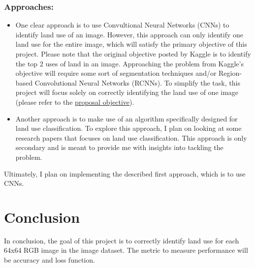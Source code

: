 \documentclass[acmtog]{acmart}
\begin{document}
	\subsubsection{Approaches:}
	\begin{itemize}
		\item One clear approach is to use Convultional Neural Networks (CNNs) to identify land use of an image. However, this approach can only identify one land use for the entire image, which will satisfy the primary objective of this project. Please note that the original objective posted by Kaggle is to identify the top 2 uses of land in an image. Approaching the problem from Kaggle's objective will require some sort of segmentation techniques and/or Region-based Convolutional Neural Networks (RCNNs). To simplify the task, this project will focus solely on correctly identifying the land use of one image (please refer to the \hyperref[sec:ProposalObjective]{proposal objective}).
		
		\item Another approach is to make use of an algorithm specifically designed for land use classification. To explore this approach, I plan on looking at some research papers that focuses on land use classification. This approach is only secondary and is meant to provide me with insights into tackling the problem.
		
	\end{itemize}
	Ultimately, I plan on implementing the described first approach, which is to use CNNs.
	
	\section{Conclusion}
	In conclusion, the goal of this project is to correctly identify land use for each 64x64 RGB image in the image dataset. The metric to measure performance will be accuracy and loss function.
	
\end{document}
